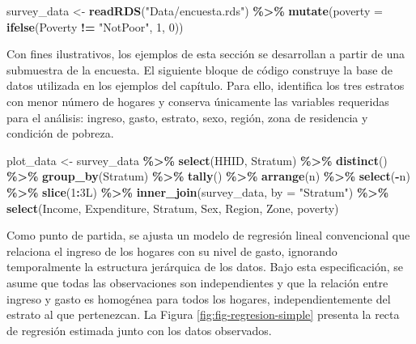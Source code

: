 \documentclass[
  spanish,
  12pt,
]{book}
\newenvironment{Shaded}{\begin{snugshade}}{\end{snugshade}}
\newcommand{\AttributeTok}[1]{\textcolor[rgb]{0.13,0.29,0.53}{#1}}
\newcommand{\DataTypeTok}[1]{\textcolor[rgb]{0.13,0.29,0.53}{#1}}
\newcommand{\DecValTok}[1]{\textcolor[rgb]{0.00,0.00,0.81}{#1}}
\newcommand{\FunctionTok}[1]{\textcolor[rgb]{0.13,0.29,0.53}{\textbf{#1}}}
\newcommand{\NormalTok}[1]{#1}
\newcommand{\OtherTok}[1]{\textcolor[rgb]{0.56,0.35,0.01}{#1}}
\newcommand{\SpecialCharTok}[1]{\textcolor[rgb]{0.81,0.36,0.00}{\textbf{#1}}}
\newcommand{\StringTok}[1]{\textcolor[rgb]{0.31,0.60,0.02}{#1}}
\begin{document}
\begin{Shaded}
\begin{Highlighting}[]
\NormalTok{survey\_data }\OtherTok{\textless{}{-}} \FunctionTok{readRDS}\NormalTok{(}\StringTok{"Data/encuesta.rds"}\NormalTok{) }\SpecialCharTok{\%\textgreater{}\%}
  \FunctionTok{mutate}\NormalTok{(}\AttributeTok{poverty =} \FunctionTok{ifelse}\NormalTok{(Poverty }\SpecialCharTok{!=} \StringTok{"NotPoor"}\NormalTok{, }\DecValTok{1}\NormalTok{, }\DecValTok{0}\NormalTok{))}
\end{Highlighting}
\end{Shaded}

Con fines ilustrativos, los ejemplos de esta sección se desarrollan a partir de una submuestra de la encuesta. El siguiente bloque de código construye la base de datos utilizada en los ejemplos del capítulo. Para ello, identifica los tres estratos con menor número de hogares y conserva únicamente las variables requeridas para el análisis: ingreso, gasto, estrato, sexo, región, zona de residencia y condición de pobreza.

\begin{Shaded}
\begin{Highlighting}[]
\NormalTok{plot\_data }\OtherTok{\textless{}{-}}\NormalTok{ survey\_data }\SpecialCharTok{\%\textgreater{}\%}
  \FunctionTok{select}\NormalTok{(HHID, Stratum) }\SpecialCharTok{\%\textgreater{}\%}
  \FunctionTok{distinct}\NormalTok{() }\SpecialCharTok{\%\textgreater{}\%}
  \FunctionTok{group\_by}\NormalTok{(Stratum) }\SpecialCharTok{\%\textgreater{}\%}
  \FunctionTok{tally}\NormalTok{() }\SpecialCharTok{\%\textgreater{}\%}
  \FunctionTok{arrange}\NormalTok{(n) }\SpecialCharTok{\%\textgreater{}\%}
  \FunctionTok{select}\NormalTok{(}\SpecialCharTok{{-}}\NormalTok{n) }\SpecialCharTok{\%\textgreater{}\%}
  \FunctionTok{slice}\NormalTok{(}\DecValTok{1}\SpecialCharTok{:}\DecValTok{3}\DataTypeTok{L}\NormalTok{) }\SpecialCharTok{\%\textgreater{}\%}
  \FunctionTok{inner\_join}\NormalTok{(survey\_data, }\AttributeTok{by =} \StringTok{"Stratum"}\NormalTok{) }\SpecialCharTok{\%\textgreater{}\%}
  \FunctionTok{select}\NormalTok{(Income, Expenditure, Stratum, Sex, Region, Zone, poverty)}
\end{Highlighting}
\end{Shaded}

Como punto de partida, se ajusta un modelo de regresión lineal convencional que relaciona el ingreso de los hogares con su nivel de gasto, ignorando temporalmente la estructura jerárquica de los datos. Bajo esta especificación, se asume que todas las observaciones son independientes y que la relación entre ingreso y gasto es homogénea para todos los hogares, independientemente del estrato al que pertenezcan. La Figura \ref{fig:fig-regresion-simple} presenta la recta de regresión estimada junto con los datos observados.
\end{document}
